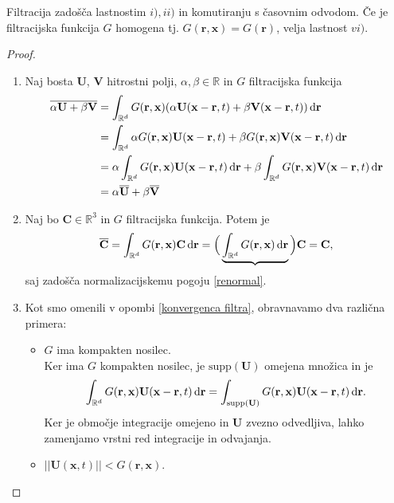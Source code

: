 \documentclass[mat2, tisk]{fmfdelo}
\newcommand{\R}{\mathbb R}
\newcommand{\bd}{\textbf}
\begin{document}
\begin{trditev}
Filtracija zadošča lastnostim $i), ii)$ in komutiranju s časovnim odvodom. 
Če je filtracijska funkcija $G$ homogena tj. $G(\bd{r}, \bd{x}) = G(\bd{r})$, velja lastnost $vi)$.
\end{trditev}

\begin{proof}
\hfill
\begin{enumerate}
  \item[i)] Naj bosta $\bd{U}$, $\bd{V}$ hitrostni polji, $\alpha, \beta \in \R$ in $G$ filtracijska 
  funkcija
  \begin{align*}
  \overline{\alpha \bd{U} + \beta \bd{V}} &= \int_{\R^d} G(\bd{r}, \bd{x}) (\alpha \bd{U}(\bd{x}-\bd{r}, t) + \beta \bd{V}(\bd{x}-\bd{r}, t)) \dif \bd{r} \\
  &= \int_{\R^d} \alpha G(\bd{r}, \bd{x}) \bd{U}(\bd{x}-\bd{r}, t) + \beta G(\bd{r}, \bd{x}) \bd{V}(\bd{x}-\bd{r}, t) \dif \bd{r} \\
  &= \alpha\int_{\R^d} G(\bd{r}, \bd{x}) \bd{U}(\bd{x}-\bd{r}, t)\dif \bd{r} + \beta\int_{\R^d}G(\bd{r}, \bd{x}) \bd{V}(\bd{x}-\bd{r}, t) \dif \bd{r} \\
  &= \alpha \overline{\bd{U}} + \beta\overline{\bd{V}}
  \end{align*}
  \item[ii)] Naj bo $\bd{C}\in \R^3$ in $G$ filtracijska funkcija. Potem je
  \begin{align*}
  \overline{\bd{C}} = \int_{\R^d} G(\bd{r}, \bd{x}) \bd{C} \dif \bd{r} = \Big(\underbrace{\int_{\R^d} G(\bd{r}, \bd{x})\dif \bd{r}}\Big) \bd{C} = \bd{C},
  \end{align*}
  saj zadošča normalizacijskemu pogoju \eqref{renormal}.
  \item[vi)] Kot smo omenili v opombi \ref{konvergenca filtra}, obravnavamo dva različna primera: 
  \begin{itemize}
    \item $G$ ima kompakten nosilec. \\
    Ker ima $G$ kompakten nosilec, je $\text{supp}(\bd{U})$ omejena množica in je
    \begin{align*}
      \int_{\R^d} G(\bd{r}, \bd{x})\bd{U}(\bd{x}-\bd{r}, t) \dif \bd{r} = \int_{\text{supp}(\bd{U})} G(\bd{r}, \bd{x})\bd{U}(\bd{x}-\bd{r}, t) \dif \bd{r}.
    \end{align*}
    Ker je območje integracije omejeno in $\bd{U}$ zvezno odvedljiva, lahko zamenjamo vrstni red integracije in odvajanja.
    \item $||\bd{U}(\bd{x}, t)|| < G(\bd{r}, \bd{x})$.

\end{itemize}
\end{enumerate}
\end{proof}
\end{document}
